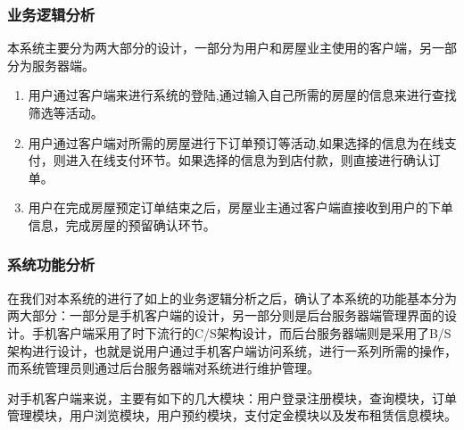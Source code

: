 \documentclass[lang=cn,11pt,a4paper,cite=authoryear]{elegantpaper}
\begin{document}
\subsubsection{业务逻辑分析}

本系统主要分为两大部分的设计，一部分为用户和房屋业主使用的客户端，另一部分为服务器端。

\begin{enumerate}
	\def\labelenumi{\arabic{enumi}.}
	\item
	用户通过客户端来进行系统的登陆,通过输入自己所需的房屋的信息来进行查找筛选等活动。
	\item
	用户通过客户端对所需的房屋进行下订单预订等活动,如果选择的信息为在线支付，则进入在线支付环节。如果选择的信息为到店付款，则直接进行确认订单。
	\item
	用户在完成房屋预定订单结束之后，房屋业主通过客户端直接收到用户的下单信息，完成房屋的预留确认环节。
\end{enumerate}

\subsubsection{系统功能分析}

在我们对本系统的进行了如上的业务逻辑分析之后，确认了本系统的功能基本分为两大部分：一部分是手机客户端的设计，另一部分则是后台服务器端管理界面的设计。手机客户端采用了时下流行的C/S架构设计，而后台服务器端则是采用了B/S架构进行设计，也就是说用户通过手机客户端访问系统，进行一系列所需的操作，而系统管理员则通过后台服务器端对系统进行维护管理。

对手机客户端来说，主要有如下的几大模块：用户登录注册模块，查询模块，订单管理模块，用户浏览模块，用户预约模块，支付定金模块以及发布租赁信息模块。
\end{document}
